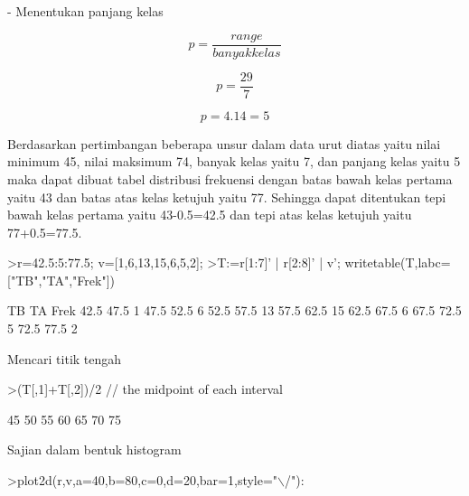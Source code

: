 \documentclass[12pt,Times new roman,letterpaper]{book}
\begin{document}
\begin{eulernootebook}
\begin{eulercomment}
\begin{eulercomment}
\begin{eulernootebook}
\begin{eulercomment}
\begin{eulercomment}
\begin{eulercomment}
\begin{eulercomment}
\begin{eulercomment}
\begin{eulercomment}
\begin{eulercomment}
\begin{eulercomment}
\begin{eulercomment}
\begin{eulercomment}
\begin{eulercomment}
\begin{eulercomment}
\begin{eulercomment}
\begin{eulercomment}
- Menentukan panjang kelas\\
\end{eulercomment}
\begin{eulerformula}
\[
p=\frac {range}{banyak kelas}
\]
\end{eulerformula}
\begin{eulerformula}
\[
p=\frac {29}{7}
\]
\end{eulerformula}
\begin{eulerformula}
\[
p= 4.14=5
\]
\end{eulerformula}
\begin{eulercomment}
Berdasarkan pertimbangan beberapa unsur dalam data urut diatas yaitu
nilai minimum 45, nilai maksimum 74, banyak kelas yaitu 7, dan panjang
kelas yaitu 5 maka dapat dibuat tabel distribusi frekuensi dengan
batas bawah kelas pertama yaitu 43 dan batas atas kelas ketujuh yaitu
77. Sehingga dapat ditentukan tepi bawah kelas pertama yaitu
43-0.5=42.5 dan tepi atas kelas ketujuh yaitu 77+0.5=77.5.
\end{eulercomment}
\begin{eulerprompt}
>r=42.5:5:77.5; v=[1,6,13,15,6,5,2];
>T:=r[1:7]' | r[2:8]' | v'; writetable(T,labc=["TB","TA","Frek"])
\end{eulerprompt}
\begin{euleroutput}
          TB        TA      Frek
        42.5      47.5         1
        47.5      52.5         6
        52.5      57.5        13
        57.5      62.5        15
        62.5      67.5         6
        67.5      72.5         5
        72.5      77.5         2
\end{euleroutput}
\begin{eulercomment}
Mencari titik tengah
\end{eulercomment}
\begin{eulerprompt}
>(T[,1]+T[,2])/2 // the midpoint of each interval
\end{eulerprompt}
\begin{euleroutput}
         45 
         50 
         55 
         60 
         65 
         70 
         75 
\end{euleroutput}
\begin{eulercomment}
Sajian dalam bentuk histogram
\end{eulercomment}
\begin{eulerprompt}
>plot2d(r,v,a=40,b=80,c=0,d=20,bar=1,style="\(\backslash\)/"):
\end{eulerprompt}

\end{eulercomment}
\end{eulercomment}
\end{eulercomment}
\end{eulercomment}
\end{eulercomment}
\end{eulercomment}
\end{eulercomment}
\end{eulercomment}
\end{eulercomment}
\end{eulercomment}
\end{eulercomment}
\end{eulercomment}
\end{eulercomment}
\end{eulernootebook}
\end{eulercomment}
\end{eulercomment}
\end{eulernootebook}
\end{document}
